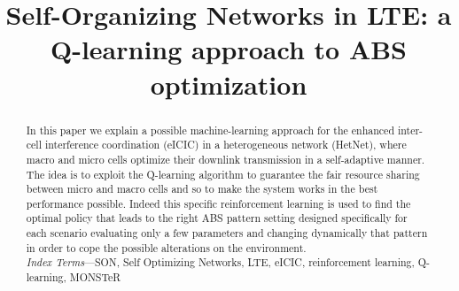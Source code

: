 \documentclass[conference,10pt]{IEEEtran}
\begin{document}
\title{Self-Organizing Networks	in LTE: a Q-learning approach to ABS optimization}

\author{
}

\maketitle

\begin{abstract}
In this paper we explain a possible machine-learning approach for the enhanced inter-cell interference coordination (eICIC) in a heterogeneous network (HetNet), where macro and micro cells optimize their downlink transmission in a self-adaptive manner. The idea is to exploit the Q-learning algorithm to guarantee the fair resource sharing between micro and macro cells and so to make the system works in the best performance possible. Indeed this specific reinforcement learning is used to find the optimal policy that leads to the right ABS pattern setting designed specifically for each scenario evaluating only a few parameters and changing dynamically that pattern in order to cope the possible alterations on the environment.\\

\textit{Index  Terms}---SON, Self Optimizing Networks, LTE, eICIC, reinforcement learning, Q-learning, MONSTeR     
\end{abstract}

\end{document}
